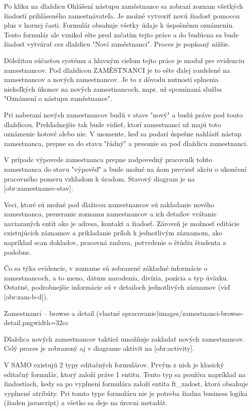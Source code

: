 Po kliku na dlaždicu Ohlášení nástupu zaměstnance sa zobrazí zoznam všetkých žiadostí prihláseného zamestnávateľa. Je možné vytvoriť novú žiadosť pomocou plus v hornej časti. Formulár obsahuje všetky údaje k úspešnému oznámeniu. Tento formulár ale vznikol ešte pred začatím tejto práce a do budúcna sa bude žiadosť vytvárať cez dlaždicu "Noví zaměstnanci". Proces je popísaný nižšie.


Dôležitou súčasťou systému a hlavným cieľom tejto práce je modul pre evidenciu zamestnancov. Pod dlaždicou \zlom ZAMĚSTNANCI je to ešte ďalej rozdelené na zamestnancov a nových zamestnancov. Je to z dôvodu nutnosti splnenia niekoľkých úkonov na nových zamestnancoch, napr. už spomínaná služba "Oznámení o nástupu zaměstnance". 

Pri naberaní nových zamestnancov budú v stave "nový" a budú práve pod touto dlaždicou. Prehľadnejšie tak bude vidieť, ktorí zamestnanci už majú toto oznámenie hotové alebo nie. V momente, keď sa podarí úspešne nahlásiť nástup zamestnanca, prepne sa do stavu "řádný" a presunie sa pod dlaždicu zamestnanci.

V prípade výpovede zamestnanca prepne zodpovedný pracovník tohto zamestnanca do stavu "výpověď" a bude možné na ňom previesť akciu o ukončení pracovného pomeru vzhľadom k úradom. Stavový diagram je na [obr:zamestnanec-stav].

Veci, ktoré sú možné pod dlažicou zamestnancov sú zakladanie nového zamestnanca, prezeranie zoznamu zamestnancov a ich detailov vrátanie naviazaných entít ako je adresa, kontakt a žiadosť. Zároveň je možnosť editácie existujúcich záznamov a prikladanie príloh k jednotlivým záznamom, ako napríklad scan dokladov, pracovná zmluva, potvrdenie o štúdiu študenta a podobne.

Čo sa týka evidencie, v zozname sú zobrazené základné informácie o zamestnancoch, a to meno, dátum narodenia, divízia, pozícia a typ úväzku. Ostatné, podrobnejšie informácie sú v detailoch jednotlivých záznamov (viď [obr:zam-b-d]).

{Zamestnanci -- browse a detail (vlastné spracovanie)}{images/zamestnanci-browse-detail.png}{width=32cc} 

Dlaždica nových zamestnancov taktiež umožňuje zakladať nových zamestnancov. Celý proces je zobrazený aj v diagrame aktivít na [obr:activity]. 

V SAMO existujú 2 typy editačných formulárov. Prvým z nich je klasický editačný formulár, ktorý založí práve 1 entitu. Tento typ sa používa napríklad na žiadostiach, kedy sa po vyplnení formulára založí entita ft\_zadost, ktorá obsahuje vyplnené atribúty. Pri tomto type formuláru nie je potreba žiadna business logika (žiaden javascript) a všetko sa deje na úrovni metadát. 

